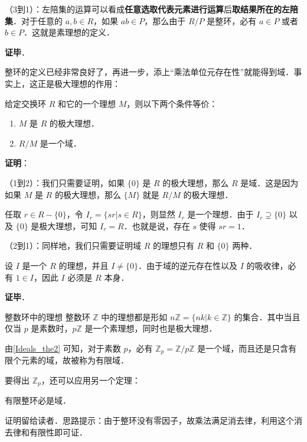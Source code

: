 （3到1）：左陪集的运算可以看成\textbf{任意选取代表元素进行运算}后\textbf{取结果所在的左陪集}．对于任意的 $a, b\in R$，如果 $ab\in P$，那么由于 $R/P$ 是整环，必有 $a\in P$ 或者 $b\in P$．这就是素理想的定义．

\textbf{证毕}．

整环的定义已经非常良好了，再进一步，添上“乘法单位元存在性”就能得到域．事实上，这正是极大理想的作用：

\begin{theorem}{}\label{Ideals_the2}
给定交换环 $R$ 和它的一个理想 $M$，则以下两个条件等价：
\begin{enumerate}
\item $M$ 是 $R$ 的极大理想．
\item $R/M$ 是一个域．
\end{enumerate}
\end{theorem}

\textbf{证明}：




（1到2）：我们只需要证明，如果 $\{0\}$ 是 $R$ 的极大理想，那么 $R$ 是域．这是因为如果 $M$ 是 $R$ 的极大理想，那么 $\{M\}$ 就是 $R/M$ 的极大理想．

任取 $r\in R-\{0\}$，令 $I_r=\{sr|s\in R\}$，则显然 $I_r$ 是一个理想．由于 $I_r\supsetneq \{0\}$ 以及 $\{0\}$ 是极大理想，可知 $I_r=R$．也就是说，存在 $s$ 使得 $sr=1$．

（2到1）：同样地，我们只需要证明域 $R$ 的理想只有 $R$ 和 $\{0\}$ 两种．

设 $I$ 是一个 $R$ 的理想，并且 $I\not=\{0\}$．由于域的逆元存在性以及 $I$ 的吸收律，必有 $1\in I$，因此 $I$ 必须是 $R$ 本身．


\textbf{证毕}．


\begin{example}{整数环中的理想}
整数环 $\mathbb{Z}$ 中的理想都是形如 $n\mathbb{Z}=\{nk|k\in\mathbb{Z}\}$ 的集合．其中当且仅当 $p$ 是素数时，$p\mathbb{Z}$ 是一个素理想，同时也是极大理想．

由\autoref{Ideals_the2} 可知，对于素数 $p$，必有 $\mathbb{Z}_p=\mathbb{Z}/p\mathbb{Z}$ 是一个域，而且还是只含有限个元素的域，故被称为有限域．
\end{example}

要得出 $\mathbb{Z}_p$，还可以应用另一个定理：

\begin{theorem}{}
有限整环必是域．
\end{theorem}

证明留给读者．思路提示：由于整环没有零因子，故乘法满足消去律，利用这个消去律和有限性即可证．



